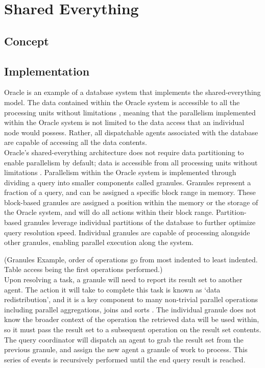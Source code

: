 \documentclass[onecolumn, draftclsnofoot,10pt, compsoc]{IEEEtran}
\begin{document}
	\newpage
	\tableofcontents
	\clearpage
	
	\section{Shared Everything}

    \subsection{Concept}

    \subsection{Implementation}
   \indent  Oracle is an example of a database system that implements the shared-everything model. The data contained within the Oracle system is accessible to all the processing units without limitations \cite{OraclePEwODF}, meaning that the parallelism implemented within the Oracle system is not limited to the data access that an individual node would possess. Rather, all dispatchable agents associated with the database are capable of accessing all the data contents. \\

\indent Oracle’s shared-everything architecture does not require data partitioning to enable parallelism by default; data is accessible from all processing units without limitations \cite{OraclePEwODF}. Parallelism within the Oracle system is implemented through dividing a query into smaller components called granules. Granules represent a fraction of a query, and can be assigned a specific block range in memory. These block-based granules are assigned a position within the memory or the storage of the Oracle system, and will do all actions within their block range. Partition-based granules leverage individual partitions of the database to further optimize query resolution speed. Individual granules are capable of processing alongside other granules, enabling parallel execution along the system. 
\graphicspath{ {./ } }
\indent (Granules Example, order of operations go from most indented to least indented. Table access being the first operations performed.)\\

\indent Upon resolving a task, a granule will need to report its result set to another agent. The action it will take to complete this task is known as ‘data redistribution’, and it is a key component to many non-trivial parallel operations including parallel aggregations, joins and sorts \cite{OraclePEwODF}. The individual granule does not know the broader context of the operation the retrieved data will be used within, so it must pass the result set to a subsequent operation on the result set contents. The query coordinator will dispatch an agent to grab the result set from the previous granule, and assign the new agent a granule of work to process. This series of events is recursively performed until the end query result is reached. \\
\end{document}
